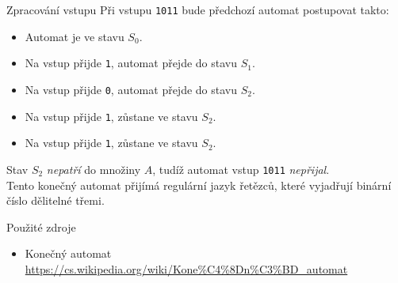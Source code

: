 \documentclass{beamer}
\begin{document}
\begin{frame}{Zpracování vstupu}
Při vstupu \texttt{1011} bude předchozí automat postupovat takto:
\begin{itemize}
    \item {Automat je ve stavu $S_0$.}
    \item {Na vstup přijde \texttt{1}, automat přejde do stavu $S_1$.}
    \item {Na vstup přijde \texttt{0}, automat přejde do stavu $S_2$.}
    \item {Na vstup přijde \texttt{1}, zůstane ve stavu $S_2$.}
    \item {Na vstup přijde \texttt{1}, zůstane ve stavu $S_2$.}
\end{itemize}

Stav $S_2$ \emph{nepatří} do množiny $A$, tudíž automat vstup \texttt{1011} \emph{nepřijal}.\\ \bigskip
Tento konečný automat přijímá regulární jazyk řetězců, které vyjadřují binární číslo dělitelné třemi.
\end{frame}

\begin{frame}{Použité zdroje}
\begin{itemize}
    \item{Konečný automat \\ 
    \url{https://cs.wikipedia.org/wiki/Kone\%C4\%8Dn\%C3\%BD_automat}}
\end{itemize}
\end{frame}
\end{document}

